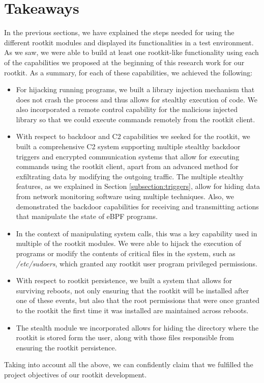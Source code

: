 \section{Takeaways}
In the previous sections, we have explained the steps needed for using the different rootkit modules and displayed its functionalities in a test environment. As we saw, we were able to build at least one rootkit-like functionality using each of the capabilities we proposed at the beginning of this research work for our rootkit. As a summary, for each of these capabilities, we achieved the following:
\begin{itemize}
\item For hijacking running programs, we built a library injection mechanism that does not crash the process and thus allows for stealthy execution of code. We also incorporated a remote control capability for the malicious injected library so that we could execute commands remotely from the rootkit client.
\item With respect to backdoor and C2 capabilities we seeked for the rootkit, we built a comprehensive C2 system supporting multiple stealthy backdoor triggers and encrypted communication systems that allow for executing commands using the rootkit client, apart from an advanced method for exfiltrating data by modifying the outgoing traffic. The multiple stealthy features, as we explained in Section \ref{subsection:triggers}, allow for hiding data from network monitoring software using multiple techniques. Also, we demonstrated the backdoor capabilities for receiving and transmitting actions that manipulate the state of eBPF programs.
\item In the context of manipulating system calls, this was a key capability used in multiple of the rootkit modules. We were able to hijack the execution of programs or modify the contents of critical files in the system, such as \textit{/etc/sudoers}, which granted any rootkit user program privileged permissions.
\item With respect to rootkit persistence, we built a system that allows for surviving reboots, not only ensuring that the rootkit will be installed after one of these events, but also that the root permissions that were once granted to the rootkit the first time it was installed are maintained across reboots.
\item The stealth module we incorporated allows for hiding the directory where the rootkit is stored form the user, along with those files responsible from ensuring the rootkit persistence.
\end{itemize}

Taking into account all the above, we can confidently claim that we fulfilled the project objectives of our rootkit development.
